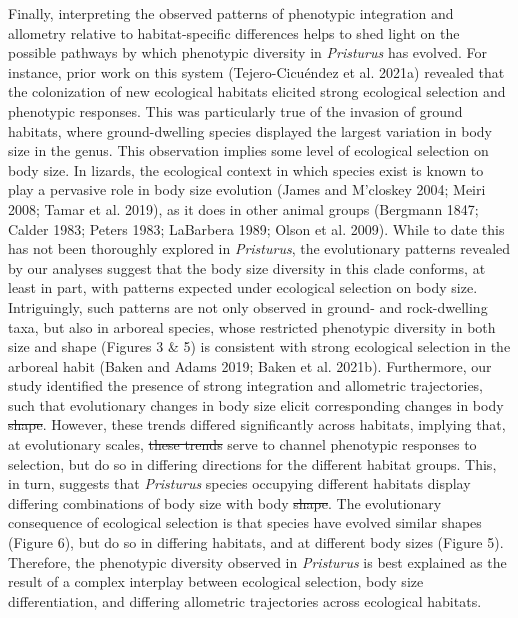 \documentclass[
  11pt,
]{article}
\providecommand{\DIFaddtex}[1]{{\protect\color{blue}\uwave{#1}}} %
\providecommand{\DIFdeltex}[1]{{\protect\color{red}\sout{#1}}}                      %
\providecommand{\DIFaddbegin}{} %
\providecommand{\DIFaddend}{} %
\providecommand{\DIFdelbegin}{} %
\providecommand{\DIFdelend}{} %
\providecommand{\DIFadd}[1]{\texorpdfstring{\DIFaddtex{#1}}{#1}} %
\providecommand{\DIFdel}[1]{\texorpdfstring{\DIFdeltex{#1}}{}} %
\newcommand{\DIFscaledelfig}{0.5}
\newlength{\DIFdelgraphicswidth} %
\newlength{\DIFdelgraphicsheight} %
\newcommand{\DIFaddincludegraphics}[2][]{{\color{blue}\fbox{\DIFOincludegraphics[#1]{#2}}}} %
\newcommand{\DIFdelincludegraphics}[2][]{%
\sbox{\DIFdelgraphicsbox}{\DIFOincludegraphics[#1]{#2}}%
\settoboxwidth{\DIFdelgraphicswidth}{\DIFdelgraphicsbox} %
\settoboxtotalheight{\DIFdelgraphicsheight}{\DIFdelgraphicsbox} %
\scalebox{\DIFscaledelfig}{%
\parbox[b]{\DIFdelgraphicswidth}{\usebox{\DIFdelgraphicsbox}\\[-\baselineskip] \rule{\DIFdelgraphicswidth}{0em}}\llap{\resizebox{\DIFdelgraphicswidth}{\DIFdelgraphicsheight}{%
\setlength{\unitlength}{\DIFdelgraphicswidth}%
\begin{picture}(1,1)%
\thicklines\linethickness{2pt} %
{\color[rgb]{1,0,0}\put(0,0){\framebox(1,1){}}}%
{\color[rgb]{1,0,0}\put(0,0){\line( 1,1){1}}}%
{\color[rgb]{1,0,0}\put(0,1){\line(1,-1){1}}}%
\end{picture}%
}\hspace*{3pt}}} %
} %
\DeclareRobustCommand{\DIFaddbegin}{\DIFOaddbegin \let\includegraphics\DIFaddincludegraphics} %
\DeclareRobustCommand{\DIFaddend}{\DIFOaddend \let\includegraphics\DIFOincludegraphics} %
\DeclareRobustCommand{\DIFdelbegin}{\DIFOdelbegin \let\includegraphics\DIFdelincludegraphics} %
\DeclareRobustCommand{\DIFdelend}{\DIFOaddend \let\includegraphics\DIFOincludegraphics} %
\begin{document}
Finally, interpreting the observed patterns of phenotypic integration
and allometry relative to habitat-specific differences helps to shed
light on the possible pathways by which phenotypic diversity in
\emph{Pristurus} has evolved. For instance, prior work on this system
(Tejero-Cicuéndez et al. 2021a) revealed that the colonization of new
ecological habitats elicited strong ecological selection and phenotypic
responses. This was particularly true of the invasion of ground
habitats, where ground-dwelling species displayed the largest variation
in body size in the genus. This observation implies some level of
ecological selection on body size. In lizards, the ecological context in
which species exist is known to play a pervasive role in body size
evolution (James and M'closkey 2004; Meiri 2008; Tamar et al. 2019), as
it does in other animal groups (Bergmann 1847; Calder 1983; Peters 1983;
LaBarbera 1989; Olson et al. 2009). While to date this has not been
thoroughly explored in \emph{Pristurus}, the evolutionary patterns
revealed by our analyses suggest that the body size diversity in this
clade conforms, at least in part, with patterns expected under
ecological selection on body size. Intriguingly, such patterns are not
only observed in ground- and rock-dwelling taxa, but also in arboreal
species, whose restricted phenotypic diversity in both size and shape
(Figures 3 \& 5) is consistent with strong ecological selection in the
arboreal habit (Baken and Adams 2019; Baken et al. 2021b). Furthermore,
our study identified the presence of strong integration and allometric
trajectories, such that evolutionary changes in body size elicit
corresponding changes in body \DIFdelbegin \DIFdel{shape}\DIFdelend \DIFaddbegin \DIFadd{form}\DIFaddend . However, these trends differed
significantly across habitats, implying that, at evolutionary scales,
\DIFdelbegin \DIFdel{these trends }\DIFdelend \DIFaddbegin \DIFadd{they }\DIFaddend serve to channel phenotypic responses to selection, but do so in
differing directions for the different habitat groups. This, in turn,
suggests that \emph{Pristurus} species occupying different habitats
display differing combinations of body size with body \DIFdelbegin \DIFdel{shape}\DIFdelend \DIFaddbegin \DIFadd{form}\DIFaddend . The
evolutionary consequence of ecological selection is that species have
evolved similar shapes (Figure 6), but do so in differing habitats, and
at different body sizes (Figure 5). Therefore, the phenotypic diversity
observed in \emph{Pristurus} is best explained as the result of a
complex interplay between ecological selection, body size
differentiation, and differing allometric trajectories across ecological
habitats.
\end{document}
